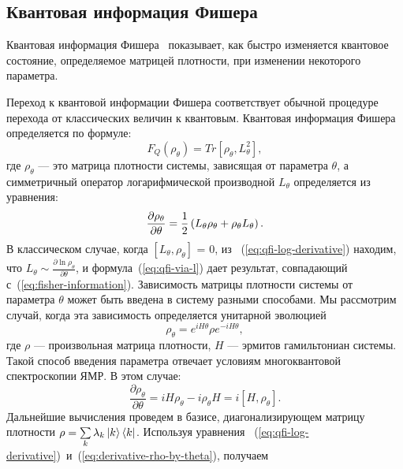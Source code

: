 \subsection{Квантовая информация Фишера}
\label{sec:quantum-fisher-information}
\begin{definition}\label{def:quantum-fisher-information}
  Квантовая информация Фишера~\cite{liu2014} показывает,
  как быстро изменяется квантовое состояние,
  определяемое матрицей плотности, при изменении некоторого параметра.
\end{definition}
Переход к квантовой информации Фишера соответствует обычной процедуре перехода от классических величин к квантовым.
Квантовая информация Фишера определяется по формуле:
%
\begin{equation}\label{eq:qfi-via-l}
  F_Q (\rho_\theta) = Tr[\rho_\theta, L^2_\theta],
\end{equation}
%
где $\rho_\theta$ --- это матрица плотности системы, зависящая от параметра $\theta$, а симметричный оператор логарифмической производной $L_\theta$ определяется из уравнения:
%
\begin{equation}\label{eq:qfi-log-derivative}
  \frac{\partial\rho_\theta}{\partial\theta} 
  = \frac{1}{2} \left( L_\theta \rho_\theta + \rho_\theta L_\theta \right).
\end{equation}
%
В классическом случае, когда $\left[L_\theta, \rho_\theta \right]$ = 0, из ~(\ref{eq:qfi-log-derivative}) находим,
что ${L_\theta\sim\frac{\partial\ln\rho_\theta}{\partial\theta}}$,
и формула~(\ref{eq:qfi-via-l}) дает результат, совпадающий с~(\ref{eq:fisher-information}).
%
Зависимость матрицы плотности системы от параметра $\theta$ может быть введена в систему разными способами.
Мы рассмотрим случай, когда эта зависимость определяется унитарной эволюцией
%
\begin{equation}%
  \rho_\theta = e^{i H \theta} \rho e^{-i H \theta},
\end{equation}
%
где $\rho$ --- произвольная матрица плотности, $H$ --- эрмитов гамильтониан системы.
Такой способ введения параметра отвечает условиям многоквантовой спектроскопии ЯМР.
В этом случае:
%
\begin{equation}\label{eq:derivative-rho-by-theta}
  \frac{\partial\rho_\theta}{\partial\theta} 
  = iH\rho_\theta - i\rho_\theta H 
  = i \left[H,\rho_\theta \right].
\end{equation}
%
Дальнейшие вычисления проведем в базисе, диагонализирующем матрицу плотности
$\rho =\sum\limits_{k} \lambda_k \left| k \right\rangle\left\langle k \right|$.
Используя уравнения ~(\ref{eq:qfi-log-derivative})~и~(\ref{eq:derivative-rho-by-theta}), получаем
